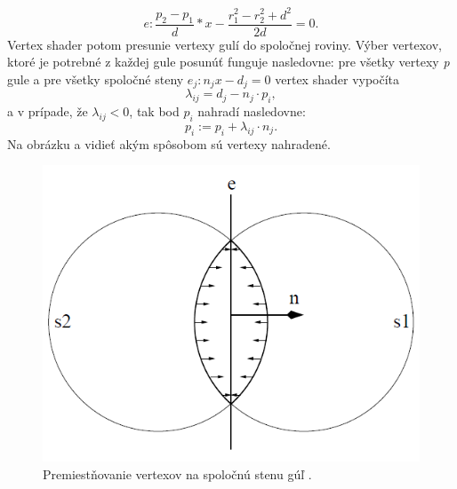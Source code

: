 \begin{equation}
	\label{eq:sunkel:common_plane}
	e: \frac{p_{2} - p_{1}}{d}\ast x - \frac{r_{1}^{2} - r_{2}^{2} + d^{2}}{2d} = 0.
\end{equation}
Vertex shader potom presunie vertexy gulí do spoločnej roviny. Výber vertexov, ktoré je potrebné z každej gule posunúť funguje nasledovne: pre všetky vertexy \textit{p} gule a pre všetky spoločné steny $e_{j}: n_{j}x - d_{j} = 0$ vertex shader vypočíta
\begin{equation}
	\label{eq:sunkel:lambda}
	\lambda _{ij} = d_{j} - n_{j}\cdot p_{i},
\end{equation}
a v prípade, že $\lambda _{ij} < 0$, tak bod $p_{i}$ nahradí nasledovne:
\begin{equation}
	\label{eq:sunkel:vertex_displacement}
	p_{i} := p_{i} + \lambda _{ij} \cdot n_{j}.
\end{equation}
Na obrázku  a  vidieť akým spôsobom sú vertexy nahradené.
\begin{figure}[H]
	\begin{center}
		\includegraphics[height=\imageHeight]{images/sunkel/verticies_displacement}
		\caption{Premiestňovanie vertexov na spoločnú stenu gúľ \cite{sunkel2004}.}
		\label{img:verticies_displacement}
	\end{center}
\end{figure}
